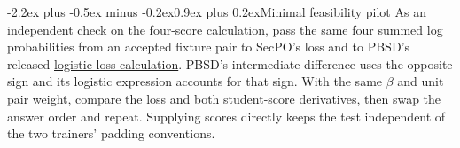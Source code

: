 \documentclass[11pt]{article}
\makeatletter
\renewcommand\section{\@startsection{section}{1}{\z@}%
  {-2.2ex plus -0.5ex minus -0.2ex}{0.9ex plus 0.2ex}{\normalfont\Large\bfseries}}
\makeatother
\begin{document}
\section{Minimal feasibility pilot}
As an independent check on the four-score calculation, pass the same four summed log probabilities from an accepted fixture pair to SecPO's loss and to PBSD's released \href{https://github.com/LucasXinYu/PBSD/blob/a6419407be9d39e75afc44446a057c75adc75a2d/pbsd_trainer.py#L688-L762}{logistic loss calculation}. PBSD's intermediate difference uses the opposite sign and its logistic expression accounts for that sign. With the same $\beta$ and unit pair weight, compare the loss and both student-score derivatives, then swap the answer order and repeat. Supplying scores directly keeps the test independent of the two trainers' padding conventions.
\end{document}
